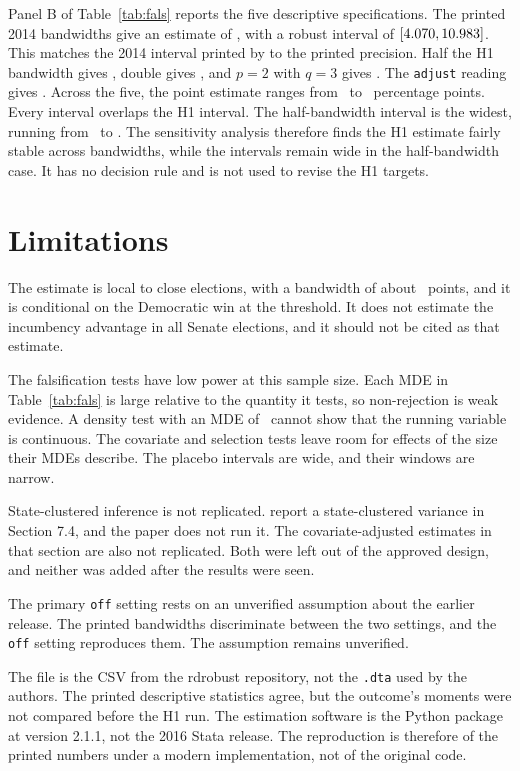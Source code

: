 \documentclass[11pt]{article}
\begin{document}
Panel B of Table~\ref{tab:fals} reports the five descriptive specifications. The printed 2014 bandwidths give an estimate of \RdSensPrintedEst, with a robust interval of $[4.070, 10.983]$. This matches the 2014 interval printed by \citet{calonico2017rdrobust} to the printed precision. Half the H1 bandwidth gives \RdSensHalfEst, double gives \RdSensDoubleEst, and $p=2$ with $q=3$ gives \RdSensPTwoEst. The \texttt{adjust} reading gives \RdSensAdjustEst. Across the five, the point estimate ranges from \RdSensDoubleEst\ to \RdSensHalfEst\ percentage points. Every interval overlaps the H1 interval. The half-bandwidth interval is the widest, running from \RdSensHalfLo\ to \RdSensHalfHi. The sensitivity analysis therefore finds the H1 estimate fairly stable across bandwidths, while the intervals remain wide in the half-bandwidth case. It has no decision rule and is not used to revise the H1 targets.

\section{Limitations}

The estimate is local to close elections, with a bandwidth of about \RdBw\ points, and it is conditional on the Democratic win at the threshold. It does not estimate the incumbency advantage in all Senate elections, and it should not be cited as that estimate.

The falsification tests have low power at this sample size. Each MDE in Table~\ref{tab:fals} is large relative to the quantity it tests, so non-rejection is weak evidence. A density test with an MDE of \RdDensityMde\ cannot show that the running variable is continuous. The covariate and selection tests leave room for effects of the size their MDEs describe. The placebo intervals are wide, and their windows are narrow.

State-clustered inference is not replicated. \citet{calonico2017rdrobust} report a state-clustered variance in Section 7.4, and the paper does not run it. The covariate-adjusted estimates in that section are also not replicated. Both were left out of the approved design, and neither was added after the results were seen.

The primary \texttt{off} setting rests on an unverified assumption about the earlier release. The printed bandwidths discriminate between the two settings, and the \texttt{off} setting reproduces them. The assumption remains unverified.

The file is the CSV from the rdrobust repository, not the \texttt{.dta} used by the authors. The printed descriptive statistics agree, but the outcome's moments were not compared before the H1 run. The estimation software is the Python package at version 2.1.1, not the 2016 Stata release. The reproduction is therefore of the printed numbers under a modern implementation, not of the original code.
\end{document}
